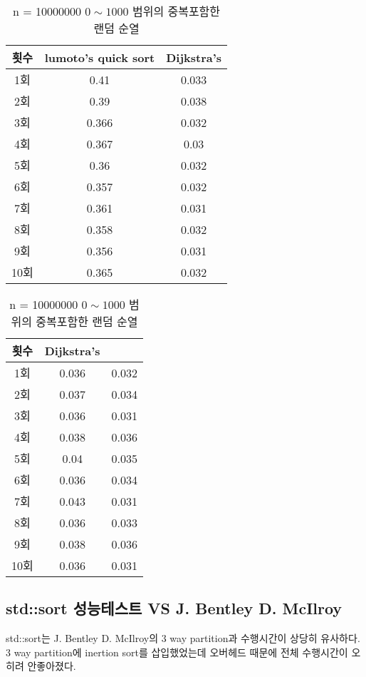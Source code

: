 \begin{table}[h!]
	\centering
	\begin{tabular}{|c|c|c|}
		\hline\hline
		횟수 & lumoto's quick sort &  Dijkstra's  \\ \hline
		1회 & 0.41 & 0.033 \\ \hline
		2회 & 0.39 & 0.038 \\ \hline
		3회 & 0.366 & 0.032 \\ \hline
		4회 & 0.367 & 0.03 \\ \hline
		5회 & 0.36 & 0.032 \\ \hline
		6회 & 0.357 & 0.032 \\ \hline
		7회 & 0.361 & 0.031 \\ \hline
		8회 & 0.358 & 0.032 \\ \hline
		9회 & 0.356 & 0.031 \\ \hline
		10회 & 0.365 & 0.032 \\ \hline
		\hline\hline
	\end{tabular}
	\caption{n = 10000000   $0 \sim 1000$ 범위의 중복포함한 랜덤 순열}
\end{table}



\begin{table}[h!]
	\centering
	\begin{tabular}{|c|c|c|}
		\hline\hline
		횟수 & Dijkstra's &  \protect\text{J. Bentley  D. McIlroy}    \\ \hline
		1회 & 0.036 & 0.032 \\ \hline
		2회 & 0.037 & 0.034 \\ \hline
		3회 & 0.036 & 0.031 \\ \hline
		4회 & 0.038 & 0.036 \\ \hline
		5회 & 0.04 & 0.035 \\ \hline
		6회 & 0.036 & 0.034 \\ \hline
		7회 & 0.043 & 0.031 \\ \hline
		8회 & 0.036 & 0.033 \\ \hline
		9회 & 0.038 & 0.036 \\ \hline
		10회 & 0.036 & 0.031 \\ \hline
		\hline\hline
	\end{tabular}
	\caption{n = 10000000  $0 \sim 1000$ 범위의 중복포함한 랜덤 순열}
\end{table}

\newpage

\subsection{ std::sort 성능테스트 VS J. Bentley  D. McIlroy}
std::sort는 J. Bentley  D. McIlroy의 3 way partition과 수행시간이 상당히 유사하다.
3 way partition에 inertion sort를 삽입했었는데 오버헤드 때문에 전체 수행시간이 오히려 안좋아졌다.


